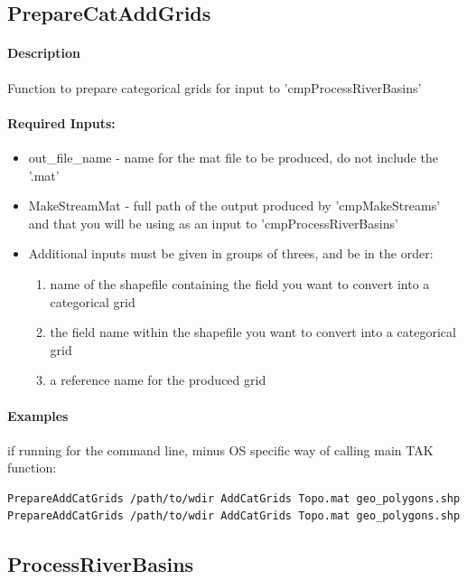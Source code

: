 \subsection{PrepareCatAddGrids}
\paragraph{Description}
Function to prepare categorical grids for input to 'cmpProcessRiverBasins'

\paragraph{ Required Inputs:}
\begin{itemize}
\item out\_file\_name - name for the mat file to be produced, do not include the '.mat'
\item MakeStreamMat - full path of the output produced by 'cmpMakeStreams' and that you will be
using as an input to 'cmpProcessRiverBasins'

\item Additional inputs must be given in groups of threes, and be in the order: 
\begin{enumerate}
\item name of the shapefile containing the field you want to convert into a categorical grid
\item the field name within the shapefile you want to convert into a categorical grid
\item  a reference name for the produced grid
\end{enumerate}
\end{itemize}

\paragraph{Examples} if running for the command line, minus OS specific way of calling main TAK function:
\begin{lstlisting}[language=bash]
PrepareAddCatGrids /path/to/wdir AddCatGrids Topo.mat geo_polygons.shp RTYPE rock_type
PrepareAddCatGrids /path/to/wdir AddCatGrids Topo.mat geo_polygons.shp RTYPE rock_type geo_polygons.shp UNIT unit_name  
\end{lstlisting}

\subsection{ProcessRiverBasins}
